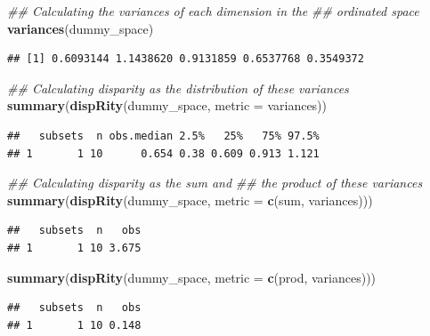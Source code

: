 \documentclass[]{book}
\newenvironment{Shaded}{\begin{snugshade}}{\end{snugshade}}
\newcommand{\CommentTok}[1]{\textcolor[rgb]{0.56,0.35,0.01}{\textit{#1}}}
\newcommand{\DataTypeTok}[1]{\textcolor[rgb]{0.13,0.29,0.53}{#1}}
\newcommand{\KeywordTok}[1]{\textcolor[rgb]{0.13,0.29,0.53}{\textbf{#1}}}
\newcommand{\NormalTok}[1]{#1}
\begin{document}
\begin{Shaded}
\begin{Highlighting}[]
\CommentTok{## Calculating the variances of each dimension in the}
\CommentTok{## ordinated space}
\KeywordTok{variances}\NormalTok{(dummy_space)}
\end{Highlighting}
\end{Shaded}

\begin{verbatim}
## [1] 0.6093144 1.1438620 0.9131859 0.6537768 0.3549372
\end{verbatim}

\begin{Shaded}
\begin{Highlighting}[]
\CommentTok{## Calculating disparity as the distribution of these variances}
\KeywordTok{summary}\NormalTok{(}\KeywordTok{dispRity}\NormalTok{(dummy_space, }\DataTypeTok{metric =}\NormalTok{ variances))}
\end{Highlighting}
\end{Shaded}

\begin{verbatim}
##   subsets  n obs.median 2.5%   25%   75% 97.5%
## 1       1 10      0.654 0.38 0.609 0.913 1.121
\end{verbatim}

\begin{Shaded}
\begin{Highlighting}[]
\CommentTok{## Calculating disparity as the sum and}
\CommentTok{## the product of these variances}
\KeywordTok{summary}\NormalTok{(}\KeywordTok{dispRity}\NormalTok{(dummy_space, }\DataTypeTok{metric =} \KeywordTok{c}\NormalTok{(sum, variances)))}
\end{Highlighting}
\end{Shaded}

\begin{verbatim}
##   subsets  n   obs
## 1       1 10 3.675
\end{verbatim}

\begin{Shaded}
\begin{Highlighting}[]
\KeywordTok{summary}\NormalTok{(}\KeywordTok{dispRity}\NormalTok{(dummy_space, }\DataTypeTok{metric =} \KeywordTok{c}\NormalTok{(prod, variances)))}
\end{Highlighting}
\end{Shaded}

\begin{verbatim}
##   subsets  n   obs
## 1       1 10 0.148
\end{verbatim}
\end{document}
